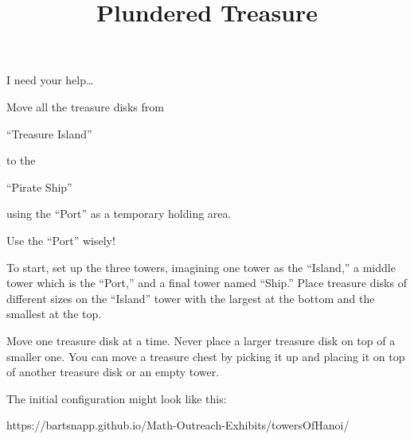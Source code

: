 \documentclass{../exhibit}
\title{Plundered Treasure}
\begin{document}
\begin{context} I need your help\dots


Move all the treasure disks from


``Treasure Island''

\quad \quad to the


\quad \quad \quad \quad ``Pirate Ship''




using the ``Port'' as a
temporary holding area.


Use the ``Port'' wisely!
\end{context}

\begin{directions} To start, set up the three towers, imagining one
tower as the ``Island,'' a middle tower which is the
``Port,'' and a final tower named ``Ship.''  Place 
treasure disks of different sizes on the ``Island'' tower
with the largest at the bottom and the smallest at the top.

Move one treasure disk at a time.  Never place
a larger treasure disk on top of a smaller one.
You can move a treasure chest by picking it up and placing it on top
of another treasure disk or an empty tower.
\end{directions}


\begin{example}
  The initial configuration might look like this:
\begin{center}
\end{center}
\end{example}


\begin{mathConnections}
  https://bartsnapp.github.io/Math-Outreach-Exhibits/towersOfHanoi/
\end{mathConnections}
\end{document}
